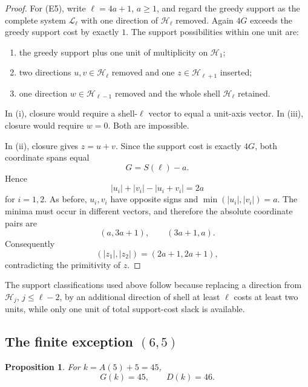 \documentclass[11pt]{article}
\newtheorem{proposition}[theorem]{Proposition}
\theoremstyle{definition}
\newcommand{\HH}{\mathcal H}
\newcommand{\LL}{\mathcal L}
\begin{document}
\begin{proof}
For (E5), write \(\ell=4a+1\), \(a\ge1\), and regard the greedy support as the complete system
\(\LL_\ell\) with one direction of \(\HH_\ell\) removed.  Again \(4G\) exceeds the greedy support cost by exactly \(1\).  The support possibilities within one unit are:

\begin{enumerate}[label=(\roman*)]
\item the greedy support plus one unit of multiplicity on \(\HH_1\);
\item two directions \(u,v\in\HH_\ell\) removed and one
\(z\in\HH_{\ell+1}\) inserted;
\item one direction \(w\in\HH_{\ell-1}\) removed and the whole shell
\(\HH_\ell\) retained.
\end{enumerate}

In (i), closure would require a shell-\(\ell\) vector to equal a unit-axis vector.  In (iii), closure would require \(w=0\).  Both are impossible.

In (ii), closure gives \(z=u+v\).  Since the support cost is exactly \(4G\), both coordinate spans equal
\[
G=S(\ell)-a.
\]
Hence
\[
|u_i|+|v_i|-|u_i+v_i|=2a
\]
for \(i=1,2\).  As before, \(u_i,v_i\) have opposite signs and
\(\min(|u_i|,|v_i|)=a\).  The minima must occur in different vectors, and therefore the absolute coordinate pairs are
\[
(a,3a+1),\qquad(3a+1,a).
\]
Consequently
\[
(|z_1|,|z_2|)=(2a+1,2a+1),
\]
contradicting the primitivity of \(z\).
\end{proof}

The support classifications used above follow because replacing a direction from
\(\HH_j\), \(j\le\ell-2\), by an additional direction of shell at least \(\ell\) costs at least two units, while only one unit of total support-cost slack is available.

\subsection{The finite exception \((6,5)\)}

\begin{proposition}\label{prop:65}
For \(k=A(5)+5=45\),
\[
G(k)=45,\qquad D(k)=46.
\]
\end{proposition}
\end{document}
